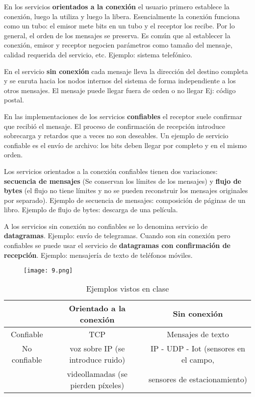\documentclass{book}
\begin{document}
	\vspace{3mm}
	En los servicios \textbf{orientados a la conexión} el usuario primero establece la conexión, luego la utiliza y luego la libera. Esencialmente la conexión funciona como un tubo: el emisor mete bits en un tubo y el receptor los recibe. Por lo general, el orden de los mensajes se preserva. Es común que al establecer la conexión, emisor y receptor negocien parámetros como tamaño del mensaje, calidad requerida del servicio, etc. Ejemplo: sistema telefónico.
	
	\vspace{3mm}
	En el servicio \textbf{sin conexión} cada mensaje lleva la dirección del destino completa y se enruta hacia los nodos internos del sistema de forma independiente a los otros mensajes. El mensaje puede llegar fuera de orden o no llegar Ej: código postal.
	
	\vspace{3mm}
	En las implementaciones de los servicios \textbf{confiables} el receptor suele confirmar que recibió el mensaje. El proceso de confirmación de recepción introduce sobrecarga y retardos que a veces no son deseables. Un ejemplo de servicio confiable es el envío de archivo: los bits deben llegar por completo y en el mismo orden.
	
	\vspace{3mm}
	Los servicios orientados a la conexión confiables tienen dos variaciones: \textbf{secuencia de mensajes} (Se conservan los límites de los mensajes) y \textbf{flujo de bytes} (el flujo no tiene límites y no se pueden reconstruir los mensajes originales por separado). Ejemplo de secuencia de mensajes: composición de páginas de un libro. Ejemplo de flujo de bytes: descarga de una película.
	
	\vspace{3mm}
	A los servicios sin conexión no confiables se lo denomina servicio de \textbf{datagramas}. Ejemplo: envío de telegramas. Cuando son sin conexión pero confiables se puede usar el servicio de \textbf{datagramas con confirmación de recepción}. Ejemplo: mensajería de texto de teléfonos móviles.
	
	\begin{figure}[H]
		\centering
		\texttt{[image: 9.png]}
	\end{figure}
	
	\begin{table}[H]
		\centering
		\begin{tabular}{|c|c|c|}
			\hline
			&Orientado a la conexión&Sin conexión\\
			\hline
			Confiable&TCP&Mensajes de texto\\
			\hline
			No confiable&voz sobre IP (se introduce ruido)&IP - UDP - Iot (sensores en el campo,\\
			&videollamadas (se pierden píxeles)& sensores de estacionamiento)\\
			\hline
		\end{tabular}
		\caption{Ejemplos vistos en clase}
	\end{table}
	
\end{document}
